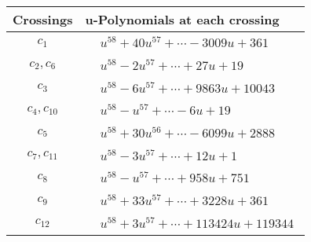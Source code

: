 \documentclass[1p]{elsarticle_modified}
\theoremstyle{definition}
\begin{document}
\begin{tabular}{m{50pt}|m{274pt}}
Crossings & \hspace{64pt}u-Polynomials at each crossing \\
\hline $$\begin{aligned}c_{1}\end{aligned}$$&$\begin{aligned}
&u^{58}+40 u^{57}+\cdots-3009 u+361
\end{aligned}$\\
\hline $$\begin{aligned}c_{2},c_{6}\end{aligned}$$&$\begin{aligned}
&u^{58}-2 u^{57}+\cdots+27 u+19
\end{aligned}$\\
\hline $$\begin{aligned}c_{3}\end{aligned}$$&$\begin{aligned}
&u^{58}-6 u^{57}+\cdots+9863 u+10043
\end{aligned}$\\
\hline $$\begin{aligned}c_{4},c_{10}\end{aligned}$$&$\begin{aligned}
&u^{58}- u^{57}+\cdots-6 u+19
\end{aligned}$\\
\hline $$\begin{aligned}c_{5}\end{aligned}$$&$\begin{aligned}
&u^{58}+30 u^{56}+\cdots-6099 u+2888
\end{aligned}$\\
\hline $$\begin{aligned}c_{7},c_{11}\end{aligned}$$&$\begin{aligned}
&u^{58}-3 u^{57}+\cdots+12 u+1
\end{aligned}$\\
\hline $$\begin{aligned}c_{8}\end{aligned}$$&$\begin{aligned}
&u^{58}- u^{57}+\cdots+958 u+751
\end{aligned}$\\
\hline $$\begin{aligned}c_{9}\end{aligned}$$&$\begin{aligned}
&u^{58}+33 u^{57}+\cdots+3228 u+361
\end{aligned}$\\
\hline $$\begin{aligned}c_{12}\end{aligned}$$&$\begin{aligned}
&u^{58}+3 u^{57}+\cdots+113424 u+119344
\end{aligned}$\\
\hline
\end{tabular}\\~\\
\end{document}
